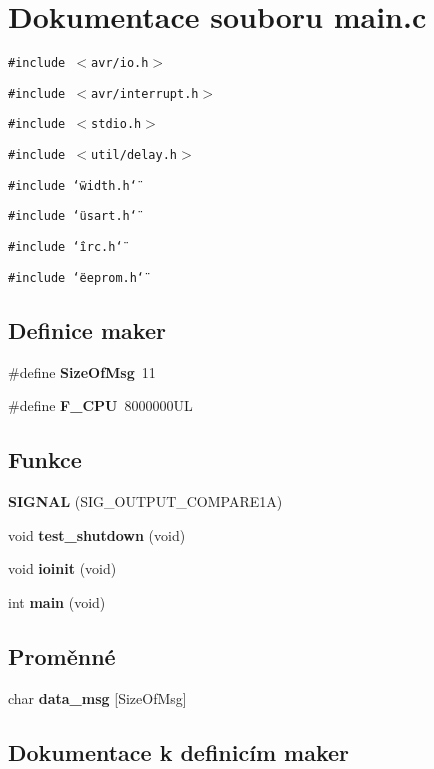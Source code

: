 \section{Dokumentace souboru main.c}
\label{main_8c}
{\tt \#include $<$avr/io.h$>$}\par
{\tt \#include $<$avr/interrupt.h$>$}\par
{\tt \#include $<$stdio.h$>$}\par
{\tt \#include $<$util/delay.h$>$}\par
{\tt \#include \char`\"{}width.h\char`\"{}}\par
{\tt \#include \char`\"{}usart.h\char`\"{}}\par
{\tt \#include \char`\"{}irc.h\char`\"{}}\par
{\tt \#include \char`\"{}eeprom.h\char`\"{}}\par
\subsection*{Definice maker}
\begin{CompactItemize}
\item 
\#define {\bf SizeOfMsg}~11
\item 
\#define {\bf F\_\-CPU}~8000000UL
\end{CompactItemize}
\subsection*{Funkce}
\begin{CompactItemize}
\item 
{\bf SIGNAL} (SIG\_\-OUTPUT\_\-COMPARE1A)
\item 
void {\bf test\_\-shutdown} (void)
\item 
void {\bf ioinit} (void)
\item 
int {\bf main} (void)
\end{CompactItemize}
\subsection*{Proměnné}
\begin{CompactItemize}
\item 
char {\bf data\_\-msg} [SizeOfMsg]
\end{CompactItemize}


\subsection{Dokumentace k definicím maker}
